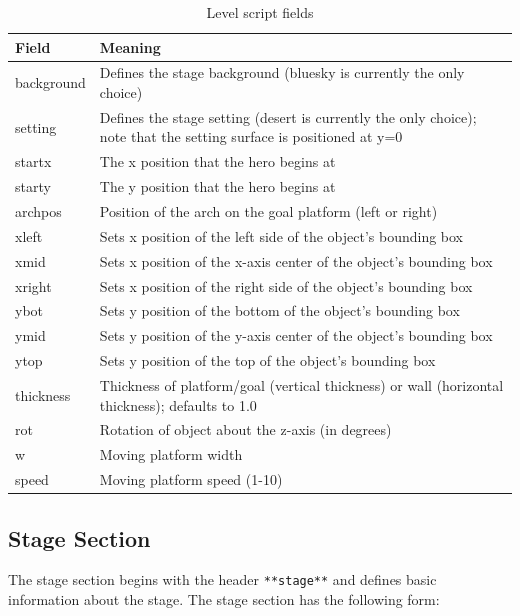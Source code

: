 \documentclass[12pt, titlepage]{article}
\begin{document}
\begin{table}[h]
\caption{Level script fields} \label{tab:fields}
\centering
\begin{tabularx}{\textwidth}{p{2cm}X}
\toprule {\bf Field} & {\bf Meaning}\\
\midrule
background & Defines the stage background (bluesky is currently the only choice)\\
setting & Defines the stage setting (desert is currently the only choice);  note that the setting surface is positioned at y=0\\
startx & The x position that the hero begins at\\
starty & The y position that the hero begins at\\
archpos & Position of the arch on the goal platform (left or right)\\
xleft & Sets x position of the left side of the object's bounding box\\
 xmid & Sets x position of the x-axis center of the object's bounding box\\
 xright & Sets x position of the right side of the object's bounding box\\
 ybot & Sets y position of the bottom of the object's bounding box\\
 ymid & Sets y position of the y-axis center of the object's bounding box\\
 ytop & Sets y position of the top of the object's bounding box\\
 thickness & Thickness of platform/goal (vertical thickness) or wall (horizontal thickness);  defaults to 1.0\\
 rot & Rotation of object about the z-axis (in degrees)\\
 w & Moving platform width\\
 speed & Moving platform speed (1-10)\\
\bottomrule
\end{tabularx}
\end{table}

\FloatBarrier



\subsection{Stage Section}
The stage section begins with the header \texttt{**stage**} and defines basic information about the stage.  The stage section has the following form:\\
\end{document}

